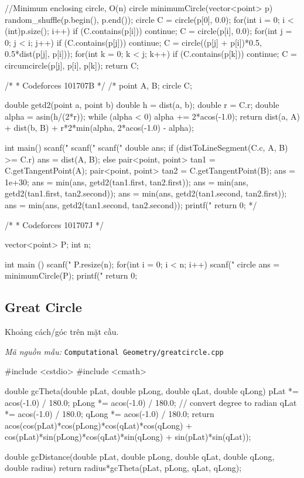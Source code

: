 \documentclass[11pt]{article}
\newcommand{\codepath}[1]{\par\noindent\textit{Mã nguồn mẫu:} \texttt{#1}\par}
\begin{document}
\begin{vncode}
//Minimum enclosing circle, O(n)
circle minimumCircle(vector<point> p) {
	random_shuffle(p.begin(), p.end());
	circle C = circle(p[0], 0.0);
	for(int i = 0; i < (int)p.size(); i++) {
		if (C.contains(p[i])) continue;
		C = circle(p[i], 0.0);
		for(int j = 0; j < i; j++) {
			if (C.contains(p[j])) continue;
			C = circle((p[j] + p[i])*0.5, 0.5*dist(p[j], p[i]));
			for(int k = 0; k < j; k++) {
				if (C.contains(p[k])) continue;
				C = circumcircle(p[j], p[i], p[k]);
			}
		}
	}
	return C;
}

/*
 * Codeforces 101707B
 */
/*
point A, B;
circle C;

double getd2(point a, point b) {
	double h = dist(a, b);
	double r = C.r;
	double alpha = asin(h/(2*r));
	while (alpha < 0) alpha += 2*acos(-1.0);
	return dist(a, A) + dist(b, B) + r*2*min(alpha, 2*acos(-1.0) - alpha);
}

int main() {
	scanf("%
	scanf("%
	scanf("%
	double ans;
	if (distToLineSegment(C.c, A, B) >= C.r) {
		ans = dist(A, B);
	}
	else {
		pair<point, point> tan1 = C.getTangentPoint(A);
		pair<point, point> tan2 = C.getTangentPoint(B);
		ans = 1e+30;
		ans = min(ans, getd2(tan1.first, tan2.first));
		ans = min(ans, getd2(tan1.first, tan2.second));
		ans = min(ans, getd2(tan1.second, tan2.first));
		ans = min(ans, getd2(tan1.second, tan2.second));
	}
	printf("%
	return 0;
}*/

/*
 * Codeforces 101707J
 */

vector<point> P;
int n;

int main () {
	scanf("%
	P.resize(n);
	for(int i = 0; i < n; i++) {
		scanf("%
	}
	circle ans = minimumCircle(P);
	printf("%
	return 0;
}
\end{vncode}
\endgroup


\subsection{Great Circle}

Khoảng cách/góc trên mặt cầu.

\codepath{Computational Geometry/greatcircle.cpp}

\begingroup\scriptsize
\begin{vncode}
#include <cstdio>
#include <cmath>

double gcTheta(double pLat, double pLong, double qLat, double qLong) {
	pLat *= acos(-1.0) / 180.0; pLong *= acos(-1.0) / 180.0; // convert degree to radian
	qLat *= acos(-1.0) / 180.0; qLong *= acos(-1.0) / 180.0;
	return acos(cos(pLat)*cos(pLong)*cos(qLat)*cos(qLong) +
		cos(pLat)*sin(pLong)*cos(qLat)*sin(qLong) +
		sin(pLat)*sin(qLat));
}

double gcDistance(double pLat, double pLong, double qLat, double qLong, double radius) {
	return radius*gcTheta(pLat, pLong, qLat, qLong);
}
\end{vncode}
\endgroup
\end{document}

